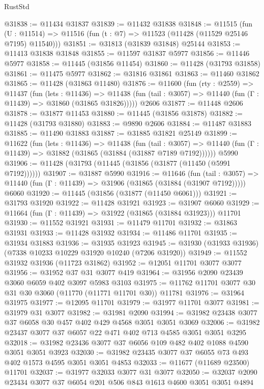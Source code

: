 \begin{lexlean}{RustStd}
\begin{coremodule}
@31838 := @11434 @31837
@31839 := @11432 @31838
@31848 := @11515
    (fun (U : @11514) => @11516 (fun (t : @7) => @11523 (@11428 (@11529 @25146 @7195) @11540)))
@31851 := @31813 (@31839 @31848) @25144
@31853 := @11413 @31838 @31848
@31855 := @11597 @31837 @5977
@31856 := @11446 @5977
@31858 := @11445 (@31856 @11454)
@31860 := @11428 (@31793 @31858)
@31861 := @11475 @5977
@31862 := @31816 @31861
@31863 := @11460 @31862
@31865 := @11428 (@31863 @11480)
@31876 := @11600
    (fun (rty : @2559) =>
    @11437
      (fun (lets : @11436) =>
      @11438 (fun (tail : @3057) => @11440 (fun (Γ : @11439) => @31860 (@31865 @31826)))))
    @2606
@31877 := @11448 @2606
@31878 := @31877 @11453
@31880 := @11445 (@31856 @31878)
@31882 := @11428 (@31793 @31880)
@31883 := @9890 @2606
@31884 := @11487 @31883
@31885 := @11490 @31883
@31887 := @31885 @31821 @25149
@31899 := @11622
    (fun (lets : @11436) =>
    @11438
      (fun (tail : @3057) =>
      @11440 (fun (Γ : @11439) => @31882 (@31865 (@31884 (@31887 @7189 @7192))))))
    @5990
@31906 := @11428 (@31793 (@11445 (@31856 (@31877 (@11450 (@5991 @7192))))))
@31907 := @31887 @5990
@31916 := @11646
    (fun (tail : @3057) => @11440 (fun (Γ : @11439) => @31906 (@31865 (@31884 (@31907 @7192)))))
    @6060
@31920 := @11445 (@31856 (@31877 (@11450 @6061)))
@31921 := @31793 @31920
@31922 := @11428 @31921
@31923 := @31907 @6060
@31929 := @11664 (fun (Γ : @11439) => @31922 (@31865 (@31884 @31923))) @11701
@31930 := @11552 @31921
@31931 := @11479 @11701
@31932 := @31863 @31931
@31933 := @11428 @31932
@31934 := @11486 @11701
@31935 := @31934 @31883
@31936 := @31935 @31923
@31945 := @31930 (@31933 @31936) (@7338 @10233 @10229 @31920 @10240 (@7206 @31920))
@31949 := @11552 @31932 @31936 (@11723 @31862)
@31952 := @12051 @11701 @3077 @3077
@31956 := @31952 @37 @31 @3077 @419
@31964 := @31956 @2090 @23439 @3060 @6059 @402 @3097 @5983 @3103
@31975 := @11762 @11701 @3077 @30 @31 @30 @3060 (@11770 (@11771 @11701 @30)) @11781
@31976 := @31964 @31975
@31977 := @12095 @11701
@31979 := @31977 @11701 @3077
@31981 := @31979 @31 @3077
@31982 := @31981 @2090
@31994 := @31982 @23438 @3077 @37 @6058 @30 @457 @402 @429 @4568 @3051 @3051 @3069
@32006 := @31982 @23437 @3077 @37 @6057 @22 @471 @402 @713 @4585 @3051 @3051 @3295
@32018 := @31982 @23436 @3077 @37 @6056 @109 @482 @402 @1088 @4590 @3051 @3051 @3923
@32030 := @31982 @23435 @3077 @37 @6055 @73 @493 @402 @1573 @4595 @3051 @3051 @4853
@32033 := @11677 (@11689 @23500) @11701
@32037 := @31977 @32033 @3077 @31 @3077
@32050 := @32037 @2090 @23434 @3077 @37 @6054 @201 @506 @843 @1613 @4600 @3051 @3051 @4894

\end{coremodule}
\end{lexlean}
